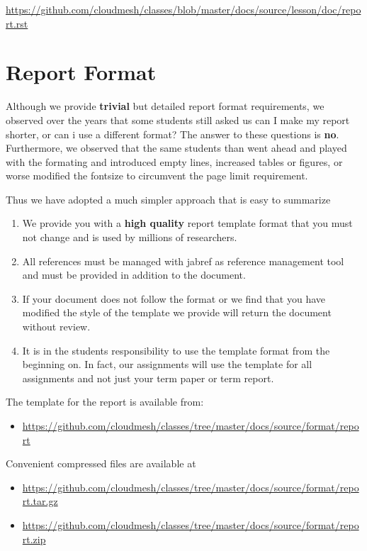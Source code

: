 \begin{fileremark}\url{https://github.com/cloudmesh/classes/blob/master/docs/source/lesson/doc/report.rst}\end{fileremark}
\section{Report Format}\label{report-format}

Although we provide \textbf{trivial} but detailed report format
requirements, we observed over the years that some students still asked
us can I make my report shorter, or can i use a different format? The
answer to these questions is \textbf{no}. Furthermore, we observed that
the same students than went ahead and played with the formating and
introduced empty lines, increased tables or figures, or worse modified
the fontsize to circumvent the page limit requirement.

Thus we have adopted a much simpler approach that is easy to summarize

\begin{enumerate}
\def\labelenumi{\arabic{enumi}.}
\tightlist
\item
  We provide you with a \textbf{high quality} report template format
  that you must not change and is used by millions of researchers.
\item
  All references must be managed with jabref as reference management
  tool and must be provided in addition to the document.
\item
  If your document does not follow the format or we find that you have
  modified the style of the template we provide will return the document
  without review.
\item
  It is in the students responsibility to use the template format from
  the beginning on. In fact, our assignments will use the template for
  all assignments and not just your term paper or term report.
\end{enumerate}

The template for the report is available from:

\begin{itemize}
\tightlist
\item
  \url{https://github.com/cloudmesh/classes/tree/master/docs/source/format/report}
\end{itemize}

Convenient compressed files are available at

\begin{itemize}
\tightlist
\item
  \url{https://github.com/cloudmesh/classes/tree/master/docs/source/format/report.tar.gz}
\item
  \url{https://github.com/cloudmesh/classes/tree/master/docs/source/format/report.zip}
\end{itemize}

